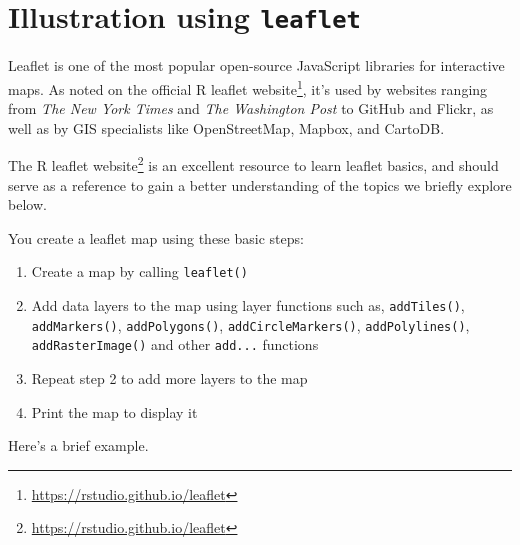 \documentclass[]{krantz}
\makeatletter
\newenvironment{Shaded}{\begin{snugshade}}{\end{snugshade}}
\newcommand{\KeywordTok}[1]{\textcolor[rgb]{0.27,0.27,0.27}{\textbf{#1}}}
\newcommand{\DataTypeTok}[1]{\textcolor[rgb]{0.27,0.27,0.27}{#1}}
\newcommand{\FloatTok}[1]{\textcolor[rgb]{0.06,0.06,0.06}{#1}}
\newcommand{\StringTok}[1]{\textcolor[rgb]{0.5,0.5,0.5}{#1}}
\newcommand{\CommentTok}[1]{\textcolor[rgb]{0.37,0.37,0.37}{\textit{#1}}}
\newcommand{\OperatorTok}[1]{\textcolor[rgb]{0.43,0.43,0.43}{\textbf{#1}}}
\newcommand{\ErrorTok}[1]{\textcolor[rgb]{0.14,0.14,0.14}{\textbf{#1}}}
\newcommand{\NormalTok}[1]{#1}
\providecommand{\tightlist}{%
  \setlength{\itemsep}{0pt}\setlength{\parskip}{0pt}}
\renewcommand{\href}[2]{#2\footnote{\url{#1}}}
\newenvironment{kframe}{%
\medskip{}
\setlength{\fboxsep}{.8em}
 \def\at@end@of@kframe{}%
 \ifinner\ifhmode%
  \def\at@end@of@kframe{\end{minipage}}%
  \begin{minipage}{\columnwidth}%
 \fi\fi%
 \def\FrameCommand##1{\hskip\@totalleftmargin \hskip-\fboxsep
 \colorbox{shadecolor}{##1}\hskip-\fboxsep
     \hskip-\linewidth \hskip-\@totalleftmargin \hskip\columnwidth}%
 \MakeFramed {\advance\hsize-\width
   \@totalleftmargin\z@ \linewidth\hsize
   \@setminipage}}%
 {\par\unskip\endMakeFramed%
 \at@end@of@kframe}
\renewenvironment{Shaded}{\begin{kframe}}{\end{kframe}}
\theoremstyle{definition}
\theoremstyle{definition}
\theoremstyle{definition}
\theoremstyle{remark}
\makeatother
\begin{document}
\section{\texorpdfstring{Illustration using
\texttt{leaflet}}{Illustration using leaflet}}\label{illustration-using-leaflet}

Leaflet is one of the most popular open-source JavaScript libraries for
interactive maps. As noted on the official
\href{https://rstudio.github.io/leaflet}{R leaflet website}, it's used
by websites ranging from \emph{The New York Times} and \emph{The
Washington Post} to GitHub and Flickr, as well as by GIS specialists
like OpenStreetMap, Mapbox, and CartoDB.

The \href{https://rstudio.github.io/leaflet}{R leaflet website} is an
excellent resource to learn leaflet basics, and should serve as a
reference to gain a better understanding of the topics we briefly
explore below.

You create a leaflet map using these basic steps:

\begin{enumerate}
\def\labelenumi{\arabic{enumi}.}
\tightlist
\item
  Create a map by calling \texttt{leaflet()}
\item
  Add data layers to the map using layer functions such as,
  \texttt{addTiles()}, \texttt{addMarkers()}, \texttt{addPolygons()},
  \texttt{addCircleMarkers()}, \texttt{addPolylines()},
  \texttt{addRasterImage()} and other \texttt{add...} functions
\item
  Repeat step 2 to add more layers to the map
\item
  Print the map to display it
\end{enumerate}

Here's a brief example.

\begin{Shaded}
\end{Shaded}
\end{document}
